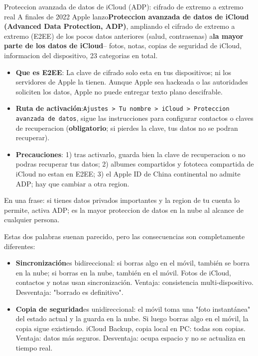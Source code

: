 \begin{tcbwarn}{Proteccion avanzada de datos de iCloud (ADP): cifrado de extremo a extremo real}
A finales de 2022 Apple lanzo\textbf{Proteccion avanzada de datos de iCloud (Advanced Data Protection, ADP)}, ampliando el cifrado de extremo a extremo (E2EE) de los pocos datos anteriores (salud, contrasenas) a\textbf{la mayor parte de los datos de iCloud}-- fotos, notas, copias de seguridad de iCloud, informacion del dispositivo, 23 categorias en total.

\begin{itemize}
  \item \textbf{Que es E2EE}: La clave de cifrado solo esta en tus dispositivos; ni los servidores de Apple la tienen. Aunque Apple sea hackeada o las autoridades soliciten los datos, Apple no puede entregar texto plano descifrable.
  \item \textbf{Ruta de activación}:\texttt{Ajustes > Tu nombre > iCloud > Proteccion avanzada de datos}, sigue las instrucciones para configurar contactos o claves de recuperacion (\textbf{obligatorio}; si pierdes la clave, tus datos no se podran recuperar).
  \item \textbf{Precauciones}: 1) tras activarlo, guarda bien la clave de recuperacion o no podras recuperar tus datos; 2) albumes compartidos y fototeca compartida de iCloud no estan en E2EE; 3) el Apple ID de China continental no admite ADP; hay que cambiar a otra region.
\end{itemize}

En una frase: si tienes datos privados importantes y la region de tu cuenta lo permite, activa ADP; es la mayor proteccion de datos en la nube al alcance de cualquier persona.

\end{tcbwarn}


Estas dos palabras suenan parecido, pero las consecuencias son completamente diferentes:

\begin{itemize}
  \item \textbf{Sincronización}es bidireccional: si borras algo en el móvil, también se borra en la nube; si borras en la nube, también en el móvil. Fotos de iCloud, contactos y notas usan sincronización. Ventaja: consistencia multi-dispositivo. Desventaja: "borrado es definitivo".
  \item \textbf{Copia de seguridad}es unidireccional: el móvil toma una "foto instantánea" del estado actual y la guarda en la nube. Si luego borras algo en el móvil, la copia sigue existiendo. iCloud Backup, copia local en PC: todas son copias. Ventaja: datos más seguros. Desventaja: ocupa espacio y no se actualiza en tiempo real.
\end{itemize}

